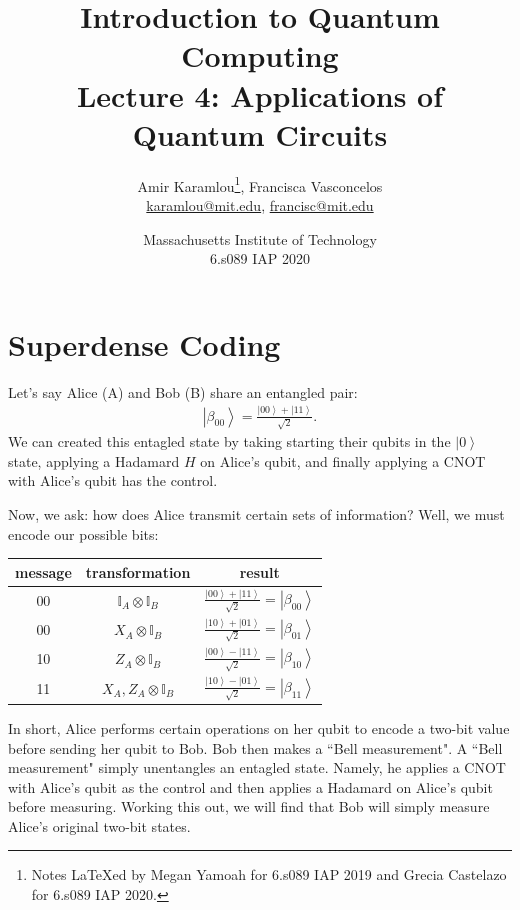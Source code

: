 \documentclass[11pt]{article} %
\author{Amir Karamlou\footnote{Notes LaTeXed by Megan Yamoah for 6.s089 IAP 2019 and Grecia Castelazo for 6.s089 IAP 2020.}, Francisca Vasconcelos \\\href{mailto:karamlou@mit.edu} {karamlou@mit.edu}, \href{mailto:francisc@mit.edu}{francisc@mit.edu}}
\title{Introduction to Quantum Computing\\Lecture 4: Applications of Quantum Circuits}
\date{Massachusetts Institute of Technology\\6.s089 IAP 2020}
\newcommand{\ket}[1]{\left|#1\right\rangle}
\begin{document}
\maketitle
\newpage
\tableofcontents
\newpage

\section{Superdense Coding}\label{superdense}
Let's say Alice (A) and Bob (B) share an entangled pair:
\begin{align}
    \ket{\beta_{00}}=\frac{\ket{00}+\ket{11}}{\sqrt{2}}.
    \label{beta00}
\end{align}
We can created this entagled state by taking starting their qubits in the $\ket{0}$ state, applying a Hadamard $H$ on Alice's qubit, and finally applying a CNOT with Alice's qubit has the control.

Now, we ask: how does Alice transmit certain sets of information? Well, we must encode our possible bits:
\begin{table}[!htbp]
    \centering
    \begin{tabular}{c|c c}
        message & transformation & result\\\hline
        00 & $\mathbb{I}_A\otimes\mathbb{I}_B$ & $\frac{\ket{00}+\ket{11}}{\sqrt{2}}=\ket{\beta_{00}}$\\
        00 & $X_A\otimes\mathbb{I}_B$ & $\frac{\ket{10}+\ket{01}}{\sqrt{2}}=\ket{\beta_{01}}$\\
        10 & $Z_A\otimes\mathbb{I}_B$ & $\frac{\ket{00}-\ket{11}}{\sqrt{2}}=\ket{\beta_{10}}$\\
        11 & $X_A,Z_A\otimes\mathbb{I}_B$ & $\frac{\ket{10}-\ket{01}}{\sqrt{2}}=\ket{\beta_{11}}$\\
    \end{tabular}
\end{table}
In short, Alice performs certain operations on her qubit to encode a two-bit value before sending her qubit to Bob. Bob then makes a ``Bell measurement". A ``Bell measurement" simply unentangles an entagled state. Namely, he applies a CNOT with Alice's qubit as the control and then applies a Hadamard on Alice's qubit before measuring. Working this out, we will find that Bob will simply measure Alice's original two-bit states.

\newpage
\end{document}

